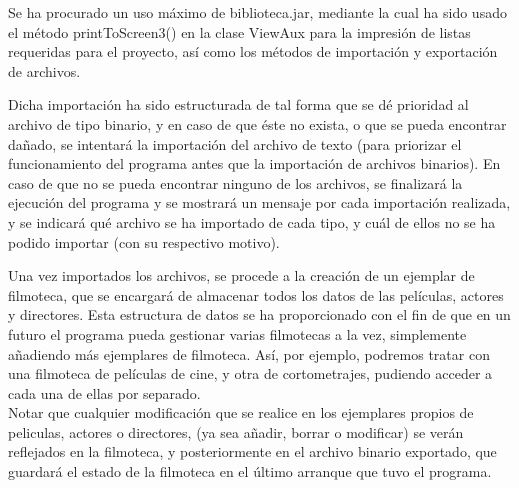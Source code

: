 \documentclass[fleqn]{article}
\begin{document}
    Se ha procurado un uso máximo de biblioteca.jar, mediante la cual ha sido usado el método printToScreen3() en la clase 
    ViewAux para la impresión de listas requeridas para el proyecto, así como los métodos de importación y exportación de
    archivos.

    Dicha importación ha sido estructurada de tal forma que se dé prioridad al archivo de tipo binario, y en caso 
    de que éste no exista, o que se pueda encontrar dañado, se intentará la importación del archivo de texto (para priorizar 
    el funcionamiento del programa antes que la importación de archivos binarios). En caso de que no se pueda encontrar ninguno 
    de los archivos, se finalizará la ejecución del programa y se mostrará un mensaje por cada importación realizada, 
    y se indicará qué archivo se ha importado de cada tipo, y cuál de ellos no se ha podido importar (con su respectivo motivo).

    Una vez importados los archivos, se procede a la creación de un ejemplar de filmoteca, que se encargará de almacenar 
    todos los datos de las películas, actores y directores. Esta estructura de datos se ha proporcionado con el fin de que
    en un futuro el programa pueda gestionar varias filmotecas a la vez, simplemente añadiendo más ejemplares de filmoteca.
    Así, por ejemplo, podremos tratar con una filmoteca de películas de cine, y otra de cortometrajes, pudiendo acceder a cada 
    una de ellas por separado. \\

    Notar que cualquier modificación que se realice en los ejemplares propios de peliculas, actores o directores, (ya sea
    añadir, borrar o modificar) se verán reflejados en la filmoteca, y posteriormente en el archivo binario exportado, que
    guardará el estado de la filmoteca en el último arranque que tuvo el programa.
\end{document}
